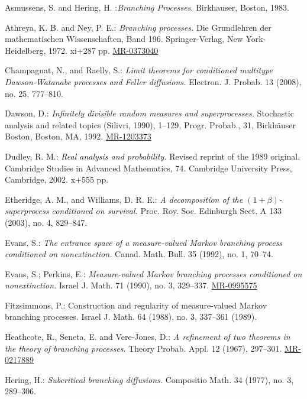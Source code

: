 \documentclass[12pt,a4paper]{amsart}
\numberwithin{equation}{section}
\theoremstyle{plain}
\theoremstyle{definition}
\theoremstyle{remark}
\def\MR#1{\href{http://www.ams.org/mathscinet-getitem?mr=#1}{MR-#1}}
\begin{document}
\begin{thebibliography}{99}

	Asmussens, S. and Hering, H. :\emph{Branching Processes}. Birkhauser, Boston, 1983.

	Athreya, K. B. and Ney, P. E.:
	\emph{Branching processes.}
	Die Grundlehren der mathematischen Wissenschaften, Band 196. Springer-Verlag, New York-Heidelberg, 1972. xi+287 pp.
	\MR{0373040}
	
	Champagnat, N., and Raelly, S.:
	\emph{Limit theorems for conditioned multitype Dawson-Watanabe processes and Feller diffusions.}
	Electron. J. Probab. 13 (2008), no. 25, 
	777--810.

	Dawson, D.:
	\emph{Infinitely divisible random measures and superprocesses.} 
	Stochastic analysis and related topics (Silivri, 1990), 1--129, Progr. Probab., 31, Birkh\"auser Boston, Boston, MA, 1992.
	\MR{1203373}
	
	Dudley, R. M.:
	\emph{Real analysis and probability.}
	Revised reprint of the 1989 original. Cambridge Studies in Advanced Mathematics, 74. Cambridge University Press, Cambridge, 2002. x+555 pp.
	
	Etheridge, A. M., and Williams, D. R. E.:
	\emph{A decomposition of the $(1+\beta)$-superprocess conditioned on survival.}
	Proc. Roy. Soc. Edinburgh Sect. A 133 (2003), no. 4, 
	829--847.
	
	Evans, S.:
	\emph{The entrance space of a measure-valued Markov branching process conditioned on nonextinction.}
	Canad. Math. Bull. 35 (1992), no. 1, 
	70--74.
	
	Evans, S.; Perkins, E.:
	\emph{Measure-valued Markov branching processes conditioned on nonextinction.}
	Israel J. Math. 71 (1990), no. 3, 
	329--337.
	\MR{0995575}
	
	Fitzsimmons, P.:
	Construction and regularity of measure-valued Markov branching processes.
	Israel J. Math. 64 (1988), no. 3, 337--361 (1989).

	Heathcote, R.,  Seneta, E.  and Vere-Jones, D.:
	\emph{ A refinement of two theorems in the theory of branching processes}.
	Theory Probab. Appl. 12 (1967), 297--301.
	\MR{0217889}
	
	Hering, H.:
	\emph{Subcritical branching diffusions.}
	Compositio Math. 34 (1977), no. 3, 
	289--306.
	

\end{thebibliography}
\end{document}
